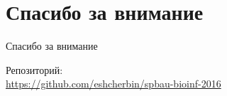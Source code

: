 \documentclass{beamer}
\begin{document}
\section{Спасибо за внимание}
\begin{frame}{Спасибо за внимание}
    \begin{center}
        Репозиторий: \\ \url{https://github.com/eshcherbin/spbau-bioinf-2016}
    \end{center}
\end{frame}
\end{document}
